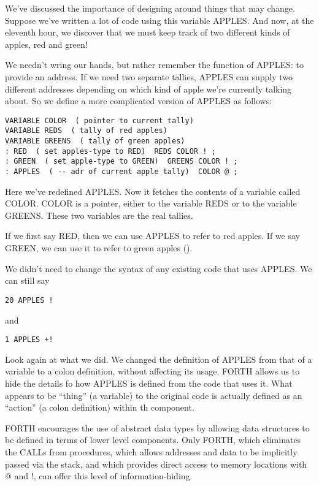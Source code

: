 We've discussed the importance of designing around things that may
change. Suppose we've written a lot of code using this variable APPLES.
And now, at the eleventh hour, we discover that we must keep track
of two different kinds of apples, red and green!

We needn't wring our hands, but rather remember the function of APPLES:
to provide an address. If we need two separate tallies, APPLES can
supply two different addresses depending on which kind of apple we're
currently talking about. So we define a more complicated version of
APPLES as follows:

\begin{verbatim}
VARIABLE COLOR  ( pointer to current tally)
VARIABLE REDS  ( tally of red apples)
VARIABLE GREENS  ( tally of green apples)
: RED  ( set apples-type to RED)  REDS COLOR ! ;
: GREEN  ( set apple-type to GREEN)  GREENS COLOR ! ;
: APPLES  ( -- adr of current apple tally)  COLOR @ ;
\end{verbatim}


Here we've redefined APPLES. Now it fetches the contents of a variable
called COLOR. COLOR is a pointer, either to the variable REDS or to
the variable GREENS. These two variables are the real tallies.

If we first say RED, then we can use APPLES to refer to red apples.
If we say GREEN, we can use it to refer to green apples ().

We didn't need to change the syntax of any existing code that uses
APPLES. We can still say

\begin{verbatim}
20 APPLES !
\end{verbatim}
and

\begin{verbatim}
1 APPLES +!
\end{verbatim}
Look again at what we did. We changed the definition of APPLES from
that of a variable to a colon definition, without affecting its usage.
FORTH allows us to hide the details fo how APPLES is defined from
the code that uses it. What appears to be {}``thing'' (a variable)
to the original code is actually defined as an {}``action'' (a colon
definition) within th component.

FORTH encourages the use of abstract data types by allowing data structures
to be defined in terms of lower level components. Only FORTH, which
eliminates the CALLs from procedures, which allows addresses and data
to be implicitly passed via the stack, and which provides direct access
to memory locations with @ and !, can offer this level of information-hiding.


